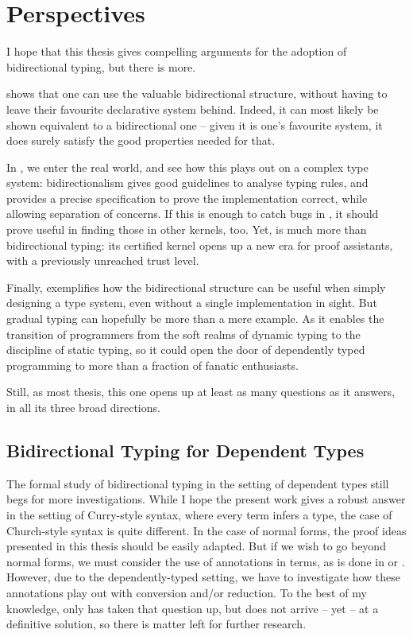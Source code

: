 \chapter{Perspectives}
\label{chap:future-work}

I hope that this thesis gives compelling arguments for the adoption of bidirectional typing,
but there is more.

 shows that one can use the valuable bidirectional structure,
without having to  leave their favourite declarative
system behind. Indeed, it can most likely  be shown equivalent to a bidirectional one
– given it is one’s favourite system, it does surely satisfy the good properties
needed for that.

In , we enter the real world, and see how this plays out
on a complex type system: bidirectionalism gives good guidelines to analyse
typing rules, and provides a precise specification to prove the implementation correct,
while allowing separation of concerns. If this is enough
to catch bugs in , it should prove useful in finding those in other kernels, too.
Yet,  is much more than bidirectional typing: its certified kernel opens
up a new era for proof assistants, with a previously unreached trust level.

Finally,
 exemplifies how the bidirectional structure can be useful when
simply designing a type system, even without a single implementation in sight.
But gradual typing can hopefully be more than a mere
example. As it enables the transition of programmers from the soft realms of
dynamic typing to the discipline of static typing, so it could open the door of
dependently typed programming to more than a fraction of fanatic enthusiasts.

Still, as most thesis, this one opens up at least as many questions as it answers,
in all its three broad directions.

\section{Bidirectional Typing for Dependent Types}

The formal study of bidirectional typing in the setting of dependent types still begs for
more investigations. While I hope the present work gives a robust answer in the setting
of Curry-style syntax, where every term infers a type,
the case of Church-style syntax is quite different. In the case of normal forms,
the proof ideas presented in this thesis should be easily adapted.
But if we wish to go beyond normal forms, we must consider the use of annotations in terms,
as is done in \eg {}  or
.
However, due to the dependently-typed
setting, we have to investigate how these annotations play out with conversion and/or reduction.
To the best of my knowledge, only \citeauthor{McBride2022} has taken that question up,
but does not arrive – yet – at a definitive solution, so there is
matter left for further research.

